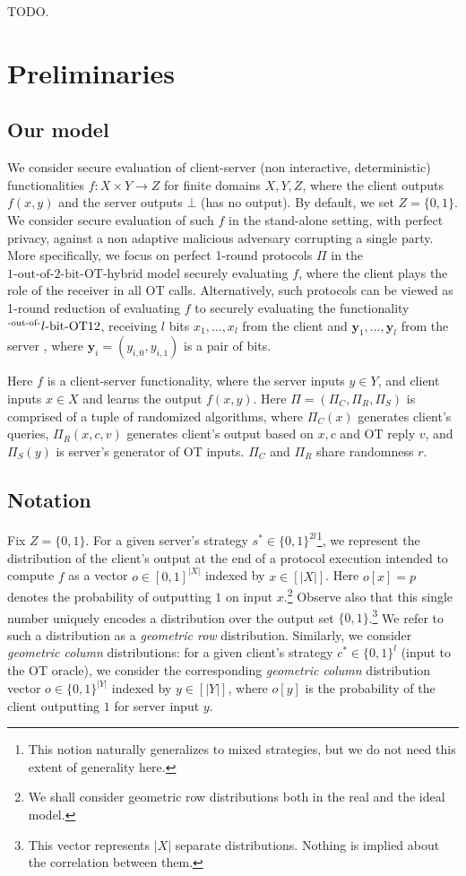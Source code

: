 \documentclass[a4paper]{article}
\newcommand{\OT}[2]{#1\text{-out-of-}#2\text{-bit-OT}}
\begin{document}
TODO.
\section{Preliminaries}

\subsection{Our model}
We consider secure evaluation of client-server (non interactive, deterministic) functionalities $f:X\times Y\rightarrow Z$ for finite domains $X,Y,Z$, where the client outputs $f(x,y)$ and the server outputs $\bot$ (has no output). By default, we set $Z=\{0,1\}$. We consider secure evaluation of such $f$ in the stand-alone setting, with perfect privacy, against a non adaptive malicious adversary corrupting a single party. More specifically, we focus 
on perfect 1-round protocols $\Pi$ in the $\OT{1}{2}$-hybrid model
securely evaluating $f$, where the client plays the role of the receiver in all OT calls. 
Alternatively, such protocols can be viewed as 1-round reduction of evaluating $f$ to securely evaluating the functionality $\OT^l{1}{2}$, receiving $l$ bits $x_1,\ldots,x_l$ from the client and $\textbf{y}_1,\ldots,\textbf{y}_l$ from the server 
, where $\textbf{y}_i=(y_{i,0},y_{i,1})$ is a pair of bits.

Here $f$ is a client-server functionality, where the server inputs $y\in Y$, and client inputs $x\in X$ and learns the output $f(x,y)$. Here $\Pi=(\Pi_C,\Pi_R,\Pi_S)$ is comprised of a tuple of randomized algorithms, where $\Pi_C(x)$ generates client's queries, $\Pi_R(x,c,v)$ generates client's output based on $x,c$ and OT reply $v$, and $\Pi_S(y)$ is server's generator of OT inputs. $\Pi_C$ and $\Pi_R$ share randomness $r$.

\subsection{Notation} 
Fix $Z=\{0,1\}$. For a given server's strategy $s^*\in\{0,1\}^{2l}$\;\footnote{This notion naturally generalizes to mixed strategies, but we do not need this extent of generality here.}, we represent the distribution of the client's output at the end of a protocol execution intended to compute $f$ as a vector $o\in [0,1]^{|X|}$ indexed by $x\in [|X|]$. Here $o[x]=p$ denotes the probability of outputting $1$ on input $x$.\footnote{We shall consider geometric row distributions both in the real and the ideal model.}
Observe also that this single number uniquely encodes a distribution over the output set $\{0,1\}$.\footnote{This vector represents $|X|$ separate distributions. Nothing is implied about the correlation between them.} We refer to such a distribution as a \emph{geometric row} distribution. Similarly, we consider \emph{geometric column} distributions: for a given client's strategy $c^*\in\{0,1\}^l$ (input to the OT oracle), we consider the corresponding \emph{geometric column} distribution vector $o\in \{0,1\}^{|Y|}$ indexed by  $y\in [|Y|]$, where $o[y]$ is the probability of the client outputting $1$ for server input $y$.
\end{document}
